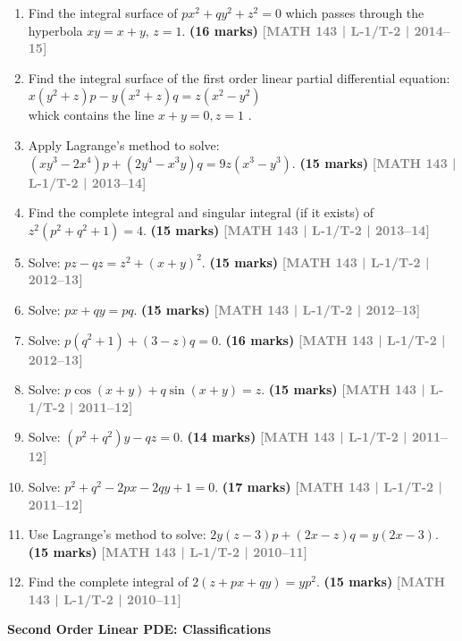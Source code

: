 \documentclass[12pt,a4paper]{article}
\newcommand{\yr}[1]{\hfill\textcolor{gray}{\small\textbf{[#1]}}}
\newcommand{\mk}[1]{\textcolor{orange!70!black}{\small\textbf{(#1 marks)}}}
\newcommand{\subtopic}[2]{%
  \vspace{10pt}
  \noindent\begin{tcolorbox}[colback=#1!8,colframe=#1,boxrule=0.6pt,arc=4pt,
    left=6pt,right=6pt,top=4pt,bottom=4pt]
    \small\bfseries\textcolor{#1}{#2}
  \end{tcolorbox}
  \vspace{2pt}
}
\begin{document}
\begin{enumerate}
\item Find the integral surface of $px^{2}+qy^{2}+z^{2}=0$ which passes through the hyperbola $xy=x+y$, $z=1$.
\mk{16\textonehalf} \yr{MATH 143 | L-1/T-2 | 2014--15}

\item Find the integral surface of the first order linear partial differential equation:\\
$\displaystyle x(y^2+z)p-y(x^2+z)q=z(x^2-y^2)$ \\ whick contains the line $x+y=0 , z=1$ . 

\item Apply Lagrange's method to solve: $(xy^{3}-2x^{4})p+(2y^{4}-x^{3}y)q=9z(x^{3}-y^{3})$.
\mk{15} \yr{MATH 143 | L-1/T-2 | 2013--14}

\item Find the complete integral and singular integral (if it exists) of $z^{2}(p^{2}+q^{2}+1)=4$.
\mk{15} \yr{MATH 143 | L-1/T-2 | 2013--14}

\item Solve: $pz-qz=z^{2}+(x+y)^{2}$.
\mk{15} \yr{MATH 143 | L-1/T-2 | 2012--13}

\item Solve: $px+qy=pq$.
\mk{15} \yr{MATH 143 | L-1/T-2 | 2012--13}

\item Solve: $p(q^{2}+1)+(3-z)q=0$.
\mk{16\textonehalf} \yr{MATH 143 | L-1/T-2 | 2012--13}

\item Solve: $p\cos(x+y)+q\sin(x+y)=z$.
\mk{15} \yr{MATH 143 | L-1/T-2 | 2011--12}

\item Solve: $(p^{2}+q^{2})y-qz=0$.
\mk{14} \yr{MATH 143 | L-1/T-2 | 2011--12}

\item Solve: $p^{2}+q^{2}-2px-2qy+1=0$.
\mk{17\textonehalf} \yr{MATH 143 | L-1/T-2 | 2011--12}

\item Use Lagrange's method to solve: $2y(z-3)p+(2x-z)q=y(2x-3)$.
\mk{15} \yr{MATH 143 | L-1/T-2 | 2010--11}

\item Find the complete integral of $2(z+px+qy)=yp^{2}$.
\mk{15} \yr{MATH 143 | L-1/T-2 | 2010--11}

\end{enumerate}

\subtopic{cF}{Second Order Linear PDE: Classifications}
\label{sub:s6-second}
\end{document}
